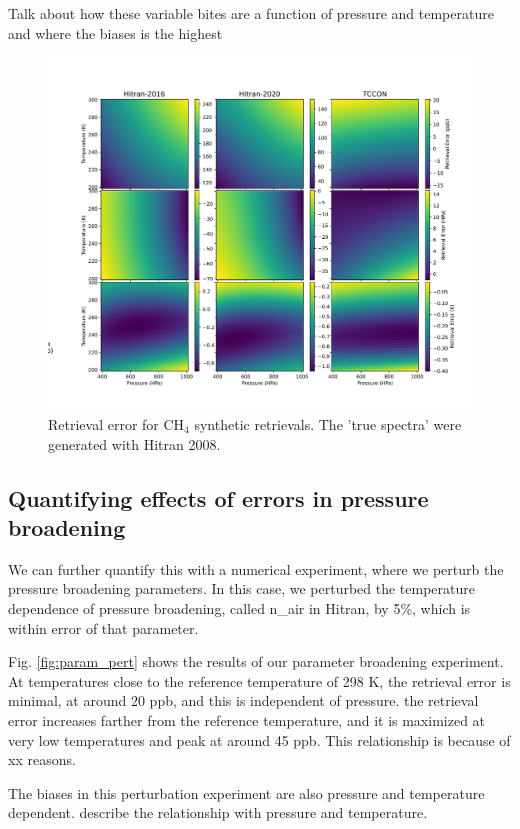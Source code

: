 \documentclass[amt, manuscript]{copernicus}
\begin{document}
Talk about how these variable bites are a function of pressure and temperature and where the biases is the highest



\begin{figure}
  \centering
  \includegraphics{heatmap_ch4.pdf}
  \caption{Retrieval error for CH$_4$ synthetic retrievals. The 'true spectra' were generated with Hitran 2008.}
  \label{fig:ch4_synthetic_retrieval}
\end{figure}


\subsection{Quantifying effects of errors in pressure broadening}
We can further quantify this with a numerical experiment, where we perturb the pressure broadening parameters. In this case, we perturbed the temperature dependence of pressure broadening, called n\_air in Hitran,  by 5\%, which is within error of that parameter.

Fig. \ref{fig:param_pert} shows the results of our parameter broadening experiment. At temperatures close to the reference temperature of 298 K, the retrieval error is minimal, at around 20 ppb, and this is independent of pressure. the retrieval error increases farther from the reference temperature, and it is maximized at very low temperatures and peak at around 45 ppb. This relationship is because of xx reasons. 

The biases in this perturbation experiment are also pressure and temperature dependent. describe the relationship with pressure and temperature. 
\end{document}
